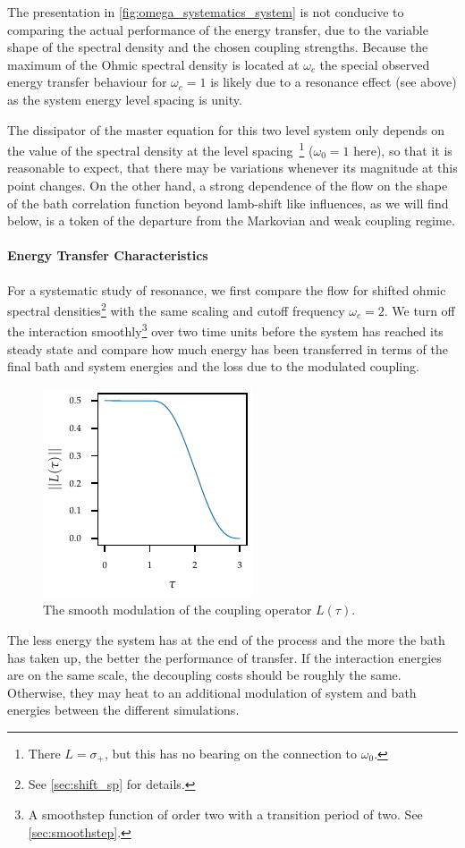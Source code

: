 The presentation in \cref{fig:omega_systematics_system} is not
conducive to comparing the actual performance of the energy transfer,
due to the variable shape of the spectral density and the chosen
coupling strengths. Because the maximum of the Ohmic spectral density
is located at \(ω_c\) the special observed energy transfer behaviour
for \(ω_c=1\) is likely due to a resonance effect (see above) as the
system energy level spacing is unity.

The dissipator of the master equation for this two level system only
depends on the value of the spectral density at the level
spacing~\cite[p. 66]{Rivas2012}\footnote{There \(L=σ_{+}\), but this
  has no bearing on the connection to \(ω_{0}\).}  (\(ω_{0}=1\) here),
so that it is reasonable to expect, that there may be variations
whenever its magnitude at this point changes.  On the other hand, a
strong dependence of the flow on the shape of the bath correlation
function beyond lamb-shift like influences, as we will find below, is
a token of the departure from the Markovian and weak coupling
regime.

\paragraph{Energy Transfer Characteristics}
For a systematic study of resonance, we first compare the flow for
shifted ohmic spectral densities\footnote{See \cref{sec:shift_sp} for
  details.} with the same scaling and cutoff frequency \(ω_c=2\). We
turn off the interaction smoothly\footnote{A smoothstep function of
  order two with a transition period of two. See
  \cref{sec:smoothstep}.} over two time units before the system has
reached its steady state and compare how much energy has been
transferred in terms of the final bath and system energies and the
loss due to the modulated coupling.

\begin{figure}
  \centering
  \includegraphics{figs/one_bath_syst/L_mod}
  \caption{\label{fig:L_mod} The smooth modulation of the coupling
    operator \(L(τ)\).}
\end{figure}
The less energy the system has at the end of the process and
the more the bath has taken up, the better the performance of
transfer. If the interaction energies are on the same scale, the
decoupling costs should be roughly the same. Otherwise, they may heat
to an additional modulation of system and bath energies between the
different simulations.

